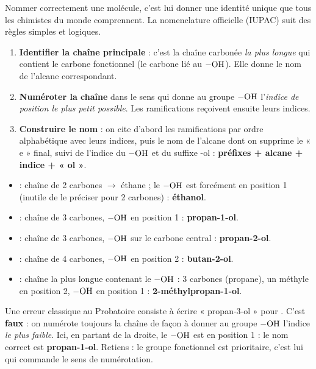 \documentclass[11pt]{article}
\newcommand{\cle}[1]{{\popxbold\color{popdark}#1}}
\newcounter{popsec}
\newcounter{popsub}
\newcommand{\courssub}[1]{%
  \stepcounter{popsub}%
  \par\vspace{9pt}\noindent{\popxbold\fontsize{11.5}{13}\selectfont\color{popink}{\color{poporange}\thepopsec.\thepopsub}\hspace{6pt}#1}\par\nopagebreak\vspace{4pt}
}
\begin{document}
\courssub{Nomenclature des alcools}

Nommer correctement une molécule, c'est lui donner une identité unique que tous les chimistes du monde comprennent. La nomenclature officielle (IUPAC) suit des règles simples et logiques.

\begin{methode}
\begin{enumerate}
\item \textbf{Identifier la chaîne principale} : c'est la chaîne carbonée \emph{la plus longue} qui contient le \cle{carbone fonctionnel} (le carbone lié au $-\ce{OH}$). Elle donne le nom de l'alcane correspondant.
\item \textbf{Numéroter la chaîne} dans le sens qui donne au groupe $-\ce{OH}$ l'\emph{indice de position le plus petit possible}. Les ramifications reçoivent ensuite leurs indices.
\item \textbf{Construire le nom} : on cite d'abord les ramifications par ordre alphabétique avec leurs indices, puis le nom de l'alcane dont on supprime le « e » final, suivi de l'indice du $-\ce{OH}$ et du suffixe \cle{-ol} : \textbf{préfixes + alcane + indice + « ol »}.
\end{enumerate}
\end{methode}

\begin{exemplebox}
\begin{itemize}
\item {} : chaîne de 2 carbones $\to$ éthane ; le $-\ce{OH}$ est forcément en position 1 (inutile de le préciser pour 2 carbones) : \textbf{éthanol}.
\item {} : chaîne de 3 carbones, $-\ce{OH}$ en position 1 : \textbf{propan-1-ol}.
\item {} : chaîne de 3 carbones, $-\ce{OH}$ sur le carbone central : \textbf{propan-2-ol}.
\item {} : chaîne de 4 carbones, $-\ce{OH}$ en position 2 : \textbf{butan-2-ol}.
\item {} : chaîne la plus longue contenant le $-\ce{OH}$ : 3 carbones (propane), un méthyle en position 2, $-\ce{OH}$ en position 1 : \textbf{2-méthylpropan-1-ol}.
\end{itemize}
\end{exemplebox}

\begin{attention}
Une erreur classique au Probatoire consiste à écrire « propan-3-ol » pour . C'est \textbf{faux} : on numérote toujours la chaîne de façon à donner au groupe $-\ce{OH}$ l'indice \emph{le plus faible}. Ici, en partant de la droite, le $-\ce{OH}$ est en position 1 : le nom correct est \textbf{propan-1-ol}. Retiens : le groupe fonctionnel est prioritaire, c'est lui qui commande le sens de numérotation.
\end{attention}
\end{document}
